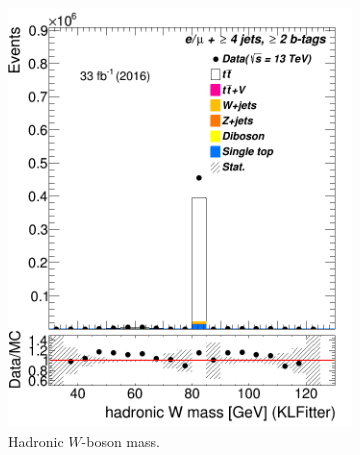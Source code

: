 \begin{figure} %
	\centering
	\begin{subfigure}{0.35\textwidth}
		\includegraphics[width=\linewidth]{ControlPlots_emujets_2016_4incl_2incl/klf_Whad_m_emujets_2016.png}
		\caption{Hadronic $W$-boson mass.} \label{fig:35}
	\end{subfigure}
	\hspace*{1.5cm}
	\begin{subfigure}{0.35\textwidth}

\end{subfigure}
\end{figure}
